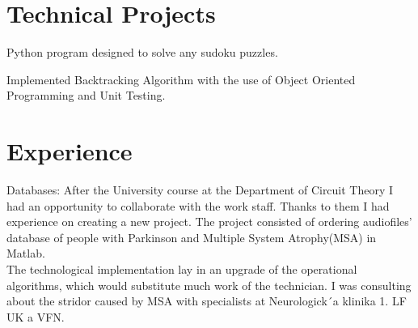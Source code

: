 \documentclass[]{deedy-resume-openfont}
\begin{document}
\hfill
\begin{minipage}[t]{0.66\textwidth} 


\section{Technical Projects}

\vspace{\topsep} %
\begin{tightemize}
\item Python program designed to solve any sudoku puzzles.
\item Implemented Backtracking Algorithm with the use of Object Oriented Programming and Unit Testing.
\end{tightemize}
\sectionsep



\section{Experience}

\vspace{\topsep} %
Databases: After the University course at the Department of Circuit Theory I had an opportunity to collaborate with the work staff. Thanks to them I had experience on creating a new project. The project consisted of ordering
audiofiles’ database of people with Parkinson and Multiple System Atrophy(MSA) in Matlab.\\
The technological implementation lay in an upgrade of the operational algorithms, which would substitute much work of the technician. I was consulting about the stridor caused by MSA with specialists at Neurologick´a klinika 1.
LF UK a VFN.
\sectionsep


\end{minipage}
\end{document}
